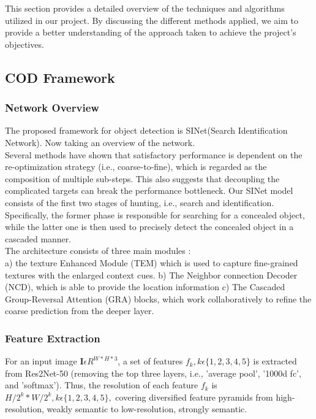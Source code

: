 \begin{multicols}{2}
This section provides a detailed overview of the techniques and algorithms utilized in our project. By discussing the different methods applied, we aim to provide a better understanding of the approach taken to achieve the project's objectives.
\vspace{0.5cm}
\subsection{{{\fontsize{14}{19}\selectfont \textbf{COD Framework}}}}
\vspace{0.5cm}
\subsubsection{{{\fontsize{13}{17}\selectfont \textbf{Network Overview}}}}
The proposed framework for object detection is SINet\cite{inproceedings}(Search Identification Network). Now taking an overview of the network.\\
Several methods have shown that satisfactory performance is dependent on the re-optimization strategy (i.e., coarse-to-fine), which is regarded as the composition of multiple sub-steps. This also suggests that decoupling
the complicated targets can break the performance bottleneck. Our SINet model consists of the first two stages of hunting, i.e., search and identification. Specifically, the former phase is responsible for searching for a concealed object, while the latter one is then used to precisely detect
the concealed object in a cascaded manner.\\
The architecture consists of three main modules :\\ 
a) the texture Enhanced Module (TEM) which is used to capture fine-grained textures with the enlarged context cues.
b) The Neighbor connection Decoder (NCD), which is able to provide the location information
c) The Cascaded Group-Reversal Attention (GRA) blocks, which work collaboratively to refine the coarse prediction from the deeper layer.
\vspace{0.5cm}
\subsubsection{{{\fontsize{13}{17}\selectfont \textbf{Feature Extraction}}}}
For an input image \(\textbf{I}\epsilon  R^{W*H*3} \), a set of features \(f_k, k\epsilon \{1, 2, 3, 4, 5\} \) is extracted from Res2Net-50 (removing the top three layers, i.e., 'average pool', '1000d fc', and 'softmax'). Thus, the resolution of each feature \(f_k\) is \(H/2^k * W/2^k, k \epsilon \{1, 2, 3, 4, 5\}, \) covering diversified feature pyramids from high-resolution, weakly semantic to low-resolution, strongly semantic.
\vspace{0.5cm}

\end{multicols}

